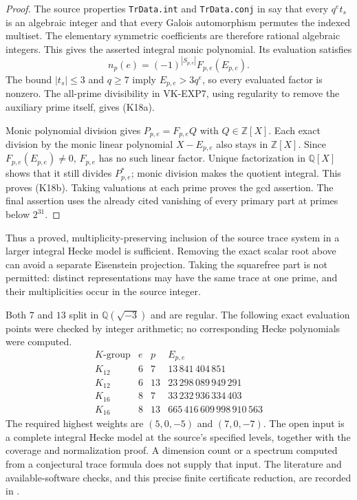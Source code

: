 \documentclass[11pt,a4paper]{article}
\theoremstyle{definition}
\begin{document}
\begin{proof}
The source properties \texttt{TrData.int} and
\texttt{TrData.conj} in  say that every
$q^e t_s$ is an algebraic integer and that every Galois automorphism
permutes the indexed multiset. The elementary symmetric
coefficients are therefore rational algebraic integers. This gives
the asserted integral monic polynomial. Its evaluation satisfies
\[
 n_p(e)=(-1)^{|S_{p,e}|}F_{p,e}(E_{p,e}).
\]
The bound $|t_s|\le3$ and $q\ge7$ imply
$E_{p,e}>3q^e$, so every evaluated factor is nonzero.
The all-prime divisibility in VK-EXP7, using regularity to remove
the auxiliary prime itself, gives (K18a).

Monic polynomial division gives $P_{p,e}=F_{p,e}Q$ with
$Q\in\mathbb Z[X]$. Each exact division by the monic linear
polynomial $X-E_{p,e}$ also stays in $\mathbb Z[X]$.
Since $F_{p,e}(E_{p,e})\ne0$, $F_{p,e}$ has no such linear
factor. Unique factorization in $\mathbb Q[X]$ shows that it still
divides $P^*_{p,e}$; monic division makes the quotient integral.
This proves (K18b). Taking valuations at each prime proves the
gcd assertion. The final assertion uses the already cited vanishing
of every primary part at primes below $2^{31}$.
\end{proof}

Thus a proved, multiplicity-preserving inclusion of the source
trace system in a larger integral Hecke model is sufficient.
Removing the exact scalar root above can avoid a separate
Eisenstein projection. Taking the squarefree part is not permitted:
distinct representations may have the same trace at one prime,
and their multiplicities occur in the source integer.

Both $7$ and $13$ split in $\mathbb Q(\sqrt{-3})$ and are regular.
The following exact evaluation points were checked by integer
arithmetic; no corresponding Hecke polynomials were computed.
\[
\begin{array}{c|r|r|r}
K\text{-group}&e&p&E_{p,e}\\\hline
K_{12}&6&7&13\,841\,404\,851\\
K_{12}&6&13&23\,298\,089\,949\,291\\
K_{16}&8&7&33\,232\,936\,334\,403\\
K_{16}&8&13&665\,416\,609\,998\,910\,563
\end{array}
\]
The required highest weights are $(5,0,-5)$ and $(7,0,-7)$.
The open input is a complete integral Hecke model at the source's
specified levels, together with the coverage and normalization
proof. A dimension count or a spectrum computed from a
conjectural trace formula does not supply that input. The
literature and available-software checks, and this precise finite
certificate reduction, are recorded in
.
\end{document}

